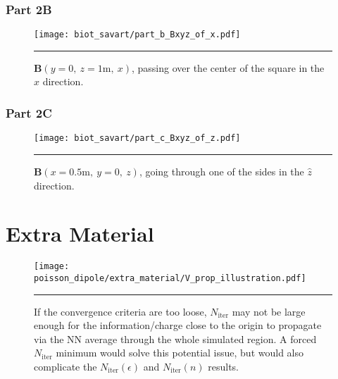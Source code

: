 \documentclass[notitlepage,aps,prd,nofootinbib]{revtex4-1}
\begin{document}
\clearpage
\subsubsection{Part 2B}
\label{subsubsec:part_2b}

\begin{figure}[!htbc]
  \centering
  \texttt{[image: biot\_savart/part\_b\_Bxyz\_of\_x.pdf]}
	{\par\nobreak\rule[9pt]{35em}{0.5pt}\vspace{-5mm}}
	\caption{$\mathbf{B}\left(y=0,~z=1\mathrm{m},~x\right)$, passing over the center of the square in the $\hat{x}$ direction.}
	\label{fig:part2b}
\end{figure}

\subsubsection{Part 2C}
\label{subsubsec:part_2c}

\begin{figure}[!htbc]
  \centering
  \texttt{[image: biot\_savart/part\_c\_Bxyz\_of\_z.pdf]}
	{\par\nobreak\rule[9pt]{35em}{0.5pt}\vspace{-5mm}}
	\caption{$\mathbf{B}\left(x=0.5\mathrm{m},~y=0,~z\right)$, going through one of the sides in the $\hat{z}$ direction.}
	\label{fig:part2c}
\end{figure}

\begin{comment}
\clearpage
\section{Conclusions}
\label{sec:Conclusions}
No time...

The Python source code used to produce these results can be found online at \url{http://github.com/mepland/PHYS_566_Computational_HW/tree/master/midterm/code}, and is included in Section~\ref{sec:code}.
\end{comment}

\clearpage
\section{Extra Material}
\label{sec:Extra_Material}

\begin{figure}[!htbc]
  \centering
  \texttt{[image: poisson\_dipole/extra\_material/V\_prop\_illustration.pdf]}
	{\par\nobreak\rule[9pt]{35em}{0.5pt}\vspace{-5mm}}
	\caption{If the convergence criteria are too loose, $N_{\mathrm{iter}}$ may not be large enough for the information/charge close to the origin to propagate via the NN average through the whole simulated region. A forced $N_{\mathrm{iter}}$ minimum would solve this potential issue, but would also complicate the $N_{\mathrm{iter}}\left(\epsilon\right)$ and $N_{\mathrm{iter}}\left(n\right)$ results.}
	\label{fig:propegation_test}
\end{figure}
\end{document}
